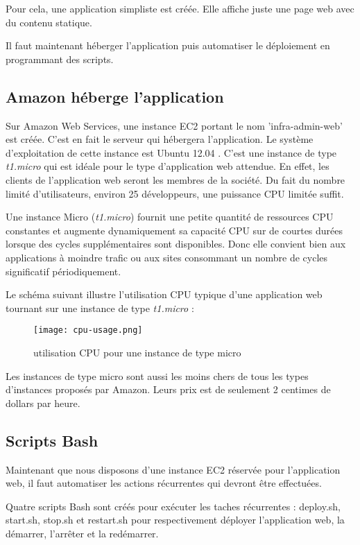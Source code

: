 Pour cela, une application simpliste est créée.
Elle affiche juste une page web avec du contenu statique.

Il faut maintenant héberger l'application puis automatiser le déploiement en
programmant des scripts.

\subsection{Amazon héberge l'application}

Sur Amazon Web Services, une instance EC2 portant le nom 'infra-admin-web' est
créée. C'est en fait le serveur qui hébergera l'application. Le
système d'exploitation de cette instance est Ubuntu 12.04 .
C'est une instance de type \textit{t1.micro} qui est idéale pour le type
d'application web attendue.
En effet, les clients de l'application web seront les membres de la société.
Du fait du nombre limité d'utilisateurs, environ 25 développeurs,
une puissance CPU limitée suffit.

Une instance Micro (\textit{t1.micro}) fournit une petite quantité de ressources CPU
constantes et augmente dynamiquement sa capacité CPU sur de courtes durées
lorsque des cycles supplémentaires sont disponibles. Donc elle convient bien
aux applications à moindre trafic ou aux sites consommant un nombre de cycles
significatif périodiquement.

Le schéma suivant illustre l'utilisation CPU typique d'une application web
tournant sur une instance de type \textit{t1.micro} :
\begin{figure}[H]
  \begin{center}
    \texttt{[image: cpu-usage.png]} 
  \end{center}
  \caption{utilisation CPU pour une instance de type micro}
\end{figure}

Les instances de type micro sont aussi les moins chers de tous les types
d'instances proposés par Amazon. Leurs prix est de seulement 2 centimes de
dollars par heure.

\subsection{Scripts Bash}

Maintenant que nous disposons d'une instance EC2 réservée pour l'application
web, il faut automatiser les actions récurrentes qui devront être effectuées.

Quatre scripts Bash sont créés pour exécuter les taches récurrentes :
deploy.sh, start.sh, stop.sh et restart.sh pour respectivement déployer
l'application web, la démarrer, l'arrêter et la redémarrer.


